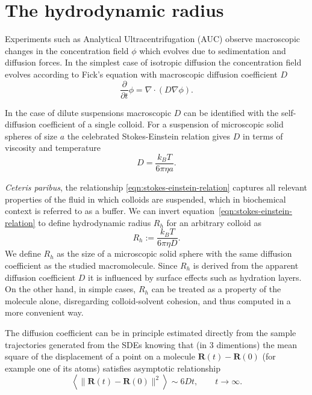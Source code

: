 \documentclass{doctoral}
\newcommand{\pd}{\partial}
\begin{document}
\section{The hydrodynamic radius}

Experiments such as Analytical Ultracentrifugation (AUC) observe macroscopic changes in the concentration field $\phi$ which evolves due to sedimentation and diffusion forces.
In the simplest case of isotropic diffusion the concentration field evolves according to Fick's equation with macroscopic diffusion coefficient $D$
\begin{equation}
    \frac{\pd}{\pd t} \phi = \nabla \cdot ( D \nabla \phi ).
    \label{eqn:ficks-law}
\end{equation}

In the case of dilute suspensions macroscopic $D$ can be identified with the self-diffusion coefficient of a single colloid.
For a suspension of microscopic solid spheres of size $a$ the celebrated Stokes-Einstein relation gives $D$ in terms of viscosity and temperature
\begin{equation}
    D = \frac{k_B T}{6 \pi \eta a}.
    \label{eqn:stokes-einstein-relation}
\end{equation}

\textit{Ceteris paribus}, the relationship \eqref{eqn:stokes-einstein-relation} captures all relevant properties of the fluid in which colloids are suspended, which in biochemical context is referred to as a buffer.
We can invert equation~\eqref{eqn:stokes-einstein-relation} to define hydrodynamic radius $R_h$ for an arbitrary colloid as
\begin{equation}
    R_h :=  \frac{k_B T}{6 \pi \eta D}.
    \label{eqn:hydrodynamic-radius-definition}
\end{equation}
We define $R_h$ as the size of a microscopic solid sphere with the same diffusion coefficient as the studied macromolecule.
Since $R_h$ is derived from the apparent diffusion coefficient $D$ it is influenced by surface effects such as hydration layers.
On the other hand, in simple cases, $R_h$ can be treated as a property of the molecule alone, disregarding colloid-solvent cohesion, and thus computed in a more convenient way.

The diffusion coefficient can be in principle estimated directly from the sample trajectories generated from the SDEs knowing that (in 3 dimentions) the mean square of the displacement of a point on a molecule $\bm{R}(t) - \bm{R}(0)$ (for example one of its atoms) satisfies asymptotic relationship
\begin{equation}
    \left< \lVert \bm{R}(t) - \bm{R}(0)\rVert^2 \right> \sim 6 D t, \quad \quad t \to \infty.
\end{equation}
\end{document}
